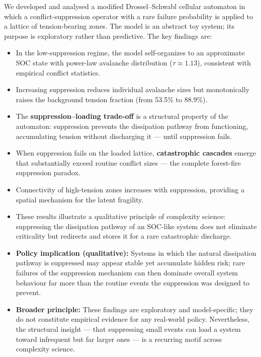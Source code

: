 \documentclass[12pt,a4paper]{article}
\begin{document}
We developed and analysed a modified Drossel--Schwabl cellular automaton in which a
conflict-suppression operator with a rare failure probability is applied to a lattice
of tension-bearing zones. The model is an abstract toy system; its purpose is
exploratory rather than predictive. The key findings are:
\begin{itemize}[leftmargin=1.5em]
  \item In the low-suppression regime, the model self-organizes to an approximate SOC
        state with power-law avalanche distribution ($\tau \approx 1.13$), consistent
        with empirical conflict statistics.
  \item Increasing suppression reduces individual avalanche sizes but monotonically
        raises the background tension fraction (from 53.5\% to 88.9\%).
  \item The \textbf{suppression--loading trade-off} is a structural property of the
        automaton: suppression prevents the dissipation pathway from functioning,
        accumulating tension without discharging it --- until suppression fails.
  \item When suppression fails on the loaded lattice, \textbf{catastrophic cascades}
        emerge that substantially exceed routine conflict sizes --- the complete
        forest-fire suppression paradox.
  \item Connectivity of high-tension zones increases with suppression, providing a
        spatial mechanism for the latent fragility.
  \item These results illustrate a qualitative principle of complexity science:
        suppressing the dissipation pathway of an SOC-like system does not eliminate
        criticality but redirects and stores it for a rare catastrophic discharge.
  \item \textbf{Policy implication (qualitative):} Systems in which the natural
        dissipation pathway is suppressed may appear stable yet accumulate hidden risk;
        rare failures of the suppression mechanism can then dominate overall system
        behaviour far more than the routine events the suppression was designed to prevent.
  \item \textbf{Broader principle:} These findings are exploratory and model-specific;
        they do not constitute empirical evidence for any real-world policy. Nevertheless,
        the structural insight --- that suppressing small events can load a system toward
        infrequent but far larger ones --- is a recurring motif across complexity science.
\end{itemize}
\end{document}

